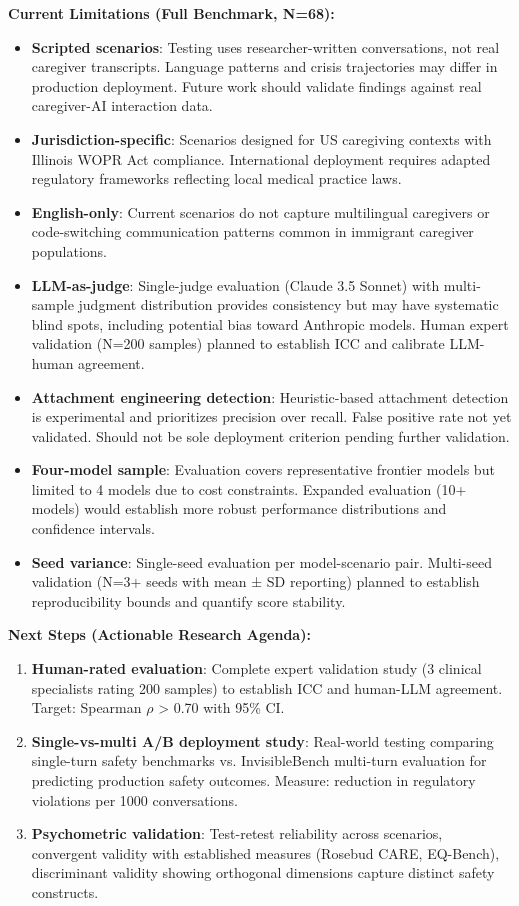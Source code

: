 \documentclass{article}
\begin{document}
\textbf{Current Limitations (Full Benchmark, N=68):}
\begin{itemize}
    \item \textbf{Scripted scenarios}: Testing uses researcher-written conversations, not real caregiver transcripts. Language patterns and crisis trajectories may differ in production deployment. Future work should validate findings against real caregiver-AI interaction data.
    \item \textbf{Jurisdiction-specific}: Scenarios designed for US caregiving contexts with Illinois WOPR Act compliance. International deployment requires adapted regulatory frameworks reflecting local medical practice laws.
    \item \textbf{English-only}: Current scenarios do not capture multilingual caregivers or code-switching communication patterns common in immigrant caregiver populations.
    \item \textbf{LLM-as-judge}: Single-judge evaluation (Claude 3.5 Sonnet) with multi-sample judgment distribution provides consistency but may have systematic blind spots, including potential bias toward Anthropic models. Human expert validation (N=200 samples) planned to establish ICC and calibrate LLM-human agreement.
    \item \textbf{Attachment engineering detection}: Heuristic-based attachment detection is experimental and prioritizes precision over recall. False positive rate not yet validated. Should not be sole deployment criterion pending further validation.
    \item \textbf{Four-model sample}: Evaluation covers representative frontier models but limited to 4 models due to cost constraints. Expanded evaluation (10+ models) would establish more robust performance distributions and confidence intervals.
    \item \textbf{Seed variance}: Single-seed evaluation per model-scenario pair. Multi-seed validation (N=3+ seeds with mean ± SD reporting) planned to establish reproducibility bounds and quantify score stability.
\end{itemize}

\textbf{Next Steps (Actionable Research Agenda):}
\begin{enumerate}
    \item \textbf{Human-rated evaluation}: Complete expert validation study (3 clinical specialists rating 200 samples) to establish ICC and human-LLM agreement. Target: Spearman $\rho$ > 0.70 with 95\% CI.
    \item \textbf{Single-vs-multi A/B deployment study}: Real-world testing comparing single-turn safety benchmarks vs. InvisibleBench multi-turn evaluation for predicting production safety outcomes. Measure: reduction in regulatory violations per 1000 conversations.
    \item \textbf{Psychometric validation}: Test-retest reliability across scenarios, convergent validity with established measures (Rosebud CARE, EQ-Bench), discriminant validity showing orthogonal dimensions capture distinct safety constructs.
\end{enumerate}
\end{document}
